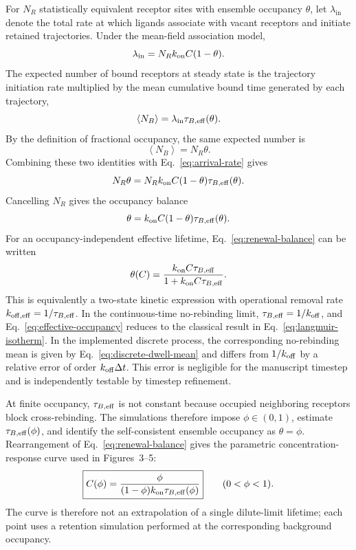 For $N_R$ statistically equivalent receptor sites with ensemble occupancy
$\theta$, let $\lambda_{\mathrm{in}}$ denote the total rate at which ligands
associate with vacant receptors and initiate retained trajectories.  Under
the mean-field association model,
\begin{equation}
 \lambda_{\mathrm{in}}
 =N_Rk_{\mathrm{on}} C(1-\theta).
 \label{eq:arrival-rate}
\end{equation}
The expected number of bound receptors at steady state is the trajectory
initiation rate multiplied by the mean cumulative bound time generated by
each trajectory,
\begin{equation*}
 \left\langle N_B\right\rangle
 =\lambda_{\mathrm{in}}\tau_{B,\mathrm{eff}}(\theta).
\end{equation*}
By the definition of fractional occupancy, the same expected number is
\begin{equation*}
 \left\langle N_B\right\rangle=N_R\theta.
\end{equation*}
Combining these two identities with Eq.~\ref{eq:arrival-rate} gives
\begin{equation*}
 N_R\theta=N_Rk_{\mathrm{on}} C(1-\theta)\tau_{B,\mathrm{eff}}(\theta).
\end{equation*}
Cancelling $N_R$ gives the occupancy balance
\begin{equation}
 \theta=k_{\mathrm{on}} C(1-\theta)\tau_{B,\mathrm{eff}}(\theta).
 \label{eq:renewal-balance}
\end{equation}
For an occupancy-independent effective lifetime, Eq.~\ref{eq:renewal-balance}
can be written
\begin{equation}
 \theta(C)=\frac{k_{\mathrm{on}} C\tau_{B,\mathrm{eff}}}{1+k_{\mathrm{on}} C\tau_{B,\mathrm{eff}}}.
 \label{eq:effective-occupancy}
\end{equation}
This is equivalently a two-state kinetic expression with operational removal
rate $k_{\mathrm{off,eff}}=1/\tau_{B,\mathrm{eff}}$.  In the continuous-time no-rebinding
limit, $\tau_{B,\mathrm{eff}}=1/k_{\mathrm{off}}$, and Eq.~\ref{eq:effective-occupancy} reduces to the
classical result in Eq.~\ref{eq:langmuir-isotherm}.  In the implemented
discrete process, the corresponding no-rebinding mean is given by
Eq.~\ref{eq:discrete-dwell-mean} and differs from $1/k_{\mathrm{off}}$ by a relative
error of order $k_{\mathrm{off}}\Delta t$.  This error is negligible for the manuscript
timestep and is independently testable by timestep refinement.

At finite occupancy, $\tau_{B,\mathrm{eff}}$ is not constant because occupied neighboring
receptors block cross-rebinding.  The simulations therefore impose
$\phi\in(0,1)$, estimate $\tau_{B,\mathrm{eff}}(\phi)$, and identify the self-consistent
ensemble occupancy as $\theta=\phi$.  Rearrangement of
Eq.~\ref{eq:renewal-balance} gives the parametric concentration-response curve
used in Figures~3--5:
\begin{equation}
 \boxed{
 C(\phi)=
 \frac{\phi}{(1-\phi)k_{\mathrm{on}}\tau_{B,\mathrm{eff}}(\phi)}
 }
 \qquad (0<\phi<1).
 \label{eq:concentration-from-phi}
\end{equation}
The curve is therefore not an extrapolation of a single dilute-limit lifetime;
each point uses a retention simulation performed at the corresponding
background occupancy.

